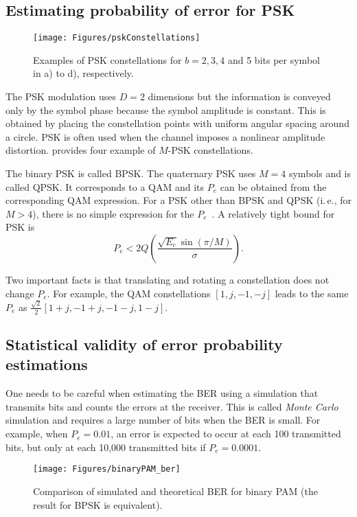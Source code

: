 \subsection{Estimating probability of error for PSK}

\begin{figure}[htbp]
\centering
\texttt{[image: Figures/pskConstellations]}
\caption{Examples of PSK constellations for $b=2,3,4$ and 5 bits per symbol in a) to d), respectively.\label{fig:pskConstellations}}
\end{figure}

The PSK modulation uses $D=2$ dimensions but the information is conveyed only by the symbol phase because the symbol amplitude is constant. This is obtained by placing the constellation points with uniform angular spacing around a circle.  PSK is often used when the channel imposes a nonlinear amplitude distortion.  provides four example of $M$-PSK constellations.

The binary PSK is called BPSK. The quaternary PSK uses $M=4$ symbols and is called QPSK. It corresponds to a QAM and its $P_e$ can be obtained from the corresponding QAM expression. 
For a PSK other than BPSK and QPSK (i.\,e., for $M>4$), there is no simple expression for the $P_e$~.
A relatively tight bound for PSK is
\[
P_e < 2 Q\left( \frac{\sqrt{E_c} \sin(\pi/M)}{\sigma}  \right).
\]

Two important facts is that translating and rotating a constellation does not change $P_e$. For example, the QAM constellations $[1,j,-1,-j]$ leads to the same $P_e$ as 
$\frac{\sqrt{2}}{2} [1+j,-1+j,-1-j,1-j]$.


\subsection{Statistical validity of error probability estimations}

One needs to be careful when estimating the BER using a simulation that transmits bits and counts the errors at the receiver. This is called \emph{Monte Carlo} simulation and requires a large number of bits when the BER is small. 
For example, when $P_e = 0.01$, an error is expected to occur at each 100 transmitted bits, but only at each 10,000 transmitted bits if $P_e = 0.0001$.

\begin{figure}[htbp]
\centering
\texttt{[image: Figures/binaryPAM\_ber]}
\caption{Comparison of simulated and theoretical BER for binary PAM (the result for BPSK is  equivalent).\label{fig:binaryPAM_ber}}
\end{figure}

